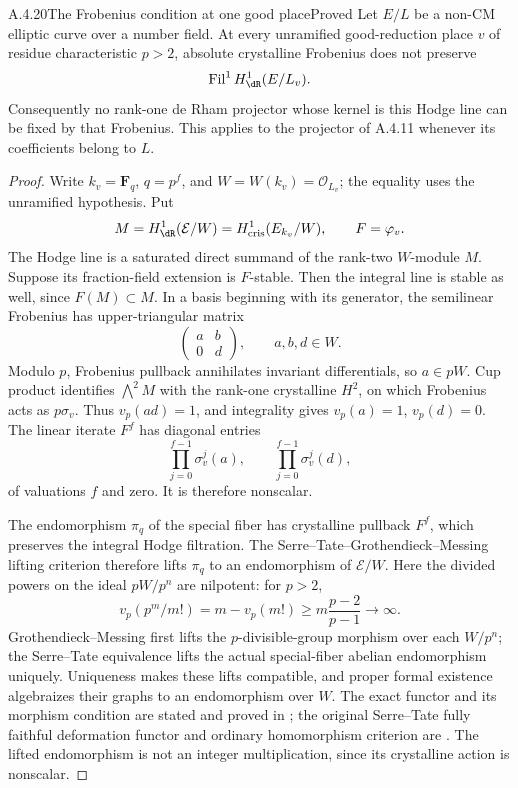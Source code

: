 \begin{result}{A.4.20}{The Frobenius condition at one good place}{Proved}
Let $E/L$ be a non-CM elliptic curve over a number field. At every unramified good-reduction place $v$ of residue characteristic $p>2$, absolute crystalline Frobenius does not preserve
\[
 \operatorname{Fil}^1 H^1_{\dR}(E/L_v).
\]
Consequently no rank-one de Rham projector whose kernel is this Hodge line can be fixed by that Frobenius. This applies to the projector of A.4.11 whenever its coefficients belong to $L$.
\end{result}
\begin{proof}
Write $k_v=\mathbf F_q$, $q=p^f$, and $W=W(k_v)=\mathcal O_{L_v}$; the equality uses the unramified hypothesis. Put
\[
 M=H^1_{\dR}(\mathcal E/W)=H^1_{\mathrm{cris}}(E_{k_v}/W),
 \qquad F=\varphi_v.
\]
The Hodge line is a saturated direct summand of the rank-two $W$-module $M$. Suppose its fraction-field extension is $F$-stable. Then the integral line is stable as well, since $F(M)\subset M$. In a basis beginning with its generator, the semilinear Frobenius has upper-triangular matrix
\[
 \begin{pmatrix}a&b\\0&d\end{pmatrix},\qquad a,b,d\in W.
\]
Modulo $p$, Frobenius pullback annihilates invariant differentials, so $a\in pW$. Cup product identifies $\bigwedge^2M$ with the rank-one crystalline $H^2$, on which Frobenius acts as $p\sigma_v$. Thus $v_p(ad)=1$, and integrality gives $v_p(a)=1$, $v_p(d)=0$. The linear iterate $F^f$ has diagonal entries
\[
 \prod_{j=0}^{f-1}\sigma_v^j(a),\qquad
 \prod_{j=0}^{f-1}\sigma_v^j(d),
\]
of valuations $f$ and zero. It is therefore nonscalar.

The endomorphism $\pi_q$ of the special fiber has crystalline pullback $F^f$, which preserves the integral Hodge filtration. The Serre--Tate--Grothendieck--Messing lifting criterion therefore lifts $\pi_q$ to an endomorphism of $\mathcal E/W$. Here the divided powers on the ideal $pW/p^n$ are nilpotent: for $p>2$,
\[
v_p(p^m/m!)=m-v_p(m!)\geq m\frac{p-2}{p-1}\longrightarrow\infty.
\]
Grothendieck--Messing first lifts the $p$-divisible-group morphism over each $W/p^n$; the Serre--Tate equivalence lifts the actual special-fiber abelian endomorphism uniquely. Uniqueness makes these lifts compatible, and proper formal existence algebraizes their graphs to an endomorphism over $W$. The exact functor and its morphism condition are stated and proved in \cite[Theorem 3.4 and Remark 3.5, pp.12--13, and Appendix B]{EllPannyRobertSferlazza2026}; the original Serre--Tate fully faithful deformation functor and ordinary homomorphism criterion are \cite[Theorem 1.2.1 and Theorem 2.1(4), pp.143--145 and 149]{EllKatz1981}. The lifted endomorphism is not an integer multiplication, since its crystalline action is nonscalar.


\end{proof}
